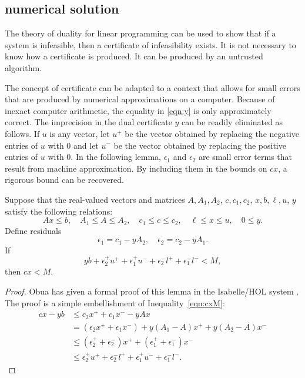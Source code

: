 \subsection{numerical solution}


The theory of duality for linear programming can be used to show that
if a system is infeasible, then a certificate of infeasibility exists.
It is not necessary to know how a certificate is produced.  It can be
produced by an untrusted algorithm.

The concept of certificate can be adapted to a context that allows for
small errors that are produced by numerical approximations on a
computer.  Because of inexact computer arithmetic, the equality in
\eqref{eqn:y} is only approximately correct. The imprecision in the dual
certificate $y$ can be readily eliminated as follows. If $u$ is any
vector, let $u^+$ be the vector obtained by replacing the negative
entries of $u$ with $0$ and let $u^-$ be the vector obtained by
replacing the positive entries of $u$ with $0$.  In the following
lemma, $\epsilon_1$ and $\epsilon_2$ are small error terms that result
from machine approximation. By including them in the bounds on $c x$,
a rigorous bound can be recovered.


\begin{lemma}  Suppose that the real-valued vectors and matrices
$A,A_1,A_2$, $c,c_1,c_2$, $x,b,\ell,u$, $y$ satisfy the following
relations:
  \[ 
  A x\le b, \quad A_1 \le A \le A_2,
  \quad c_1 \le c \le c_2,\quad \ell\le x\le u,\quad
  0\le y.
  \]
Define residuals
  \[ 
   \epsilon_1 = c_1 - y A_2,\quad \epsilon_2 = c_2  - y A_1.
  \]
If
\[ 
y b + \epsilon_2^+ u^+ + \epsilon_1^+ u^- + \epsilon_2^- l^+ + \epsilon_1^- l^- < M,
\]
then $c x < M$.
\end{lemma}

\begin{proof} Obua has given a formal proof of this lemma in the
Isabelle/HOL system \cite[3.7.2]{Obua:2008:Thesis}.  The proof
is a simple embellishment of Inequality~\ref{eqn:cxM}:
\begin{align*}
c x -y b &\le c_2 x^+ + c_1 x^- -y A x\\
              &= (\epsilon_2 x^+ + \epsilon_1 x^-)
  + y (A_1-A) x^+ + y (A_2 - A) x^- \\
              &\le (\epsilon_2^+ +\epsilon_2^-) x^+ 
       + (\epsilon_1^++\epsilon_1^-) x^-\\
              &\le \epsilon_2^+ u^+ +  \epsilon_2^- l^+ 
           + \epsilon_1^+ u^- + \epsilon_1^- l^-.
\end{align*}
\end{proof}

